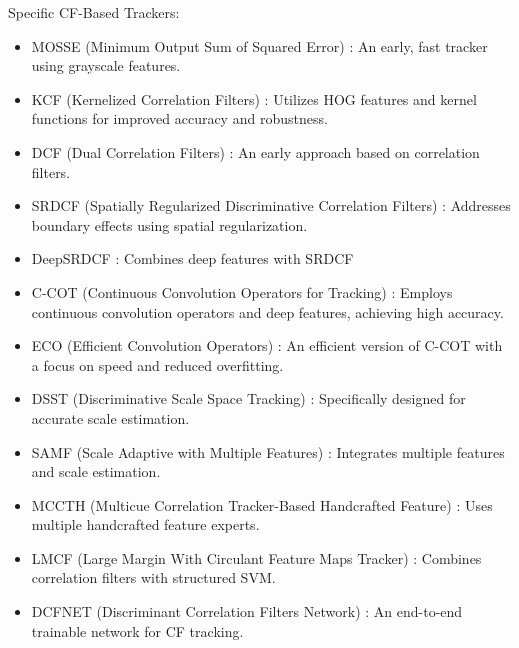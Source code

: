 Specific CF-Based Trackers:
\begin{itemize}
    \item MOSSE (Minimum Output Sum of Squared Error) \cite{lin2024motion}: An early, fast tracker using grayscale features.
    
    \item KCF (Kernelized Correlation Filters) \cite{zhao2020correlation}: Utilizes HOG features and kernel functions for improved accuracy and robustness.
    
    \item DCF (Dual Correlation Filters) \cite{feng2019dynamic}: An early approach based on correlation filters.
    
    \item SRDCF (Spatially Regularized Discriminative Correlation Filters) \cite{feng2019dynamic}: Addresses boundary effects using spatial regularization.
    
    \item DeepSRDCF \cite{zhao2020correlation}: Combines deep features with SRDCF
    
    \item C-COT (Continuous Convolution Operators for Tracking) \cite{du2021overview}: Employs continuous convolution operators and deep features, achieving high accuracy.
    
    \item ECO (Efficient Convolution Operators) \cite{feng2019dynamic}: An efficient version of C-COT with a focus on speed and reduced overfitting.
    
    \item DSST (Discriminative Scale Space Tracking) \cite{feng2019dynamic}: Specifically designed for accurate scale estimation.
    
    \item SAMF (Scale Adaptive with Multiple Features) \cite{lin2024motion}: Integrates multiple features and scale estimation.
    
    \item MCCTH (Multicue Correlation Tracker-Based Handcrafted Feature) \cite{du2021overview}: Uses multiple handcrafted feature experts.
    
    \item LMCF (Large Margin With Circulant Feature Maps Tracker) \cite{du2021overview}: Combines correlation filters with structured SVM.
    
    \item DCFNET (Discriminant Correlation Filters Network) \cite{du2021overview}: An end-to-end trainable network for CF tracking.
    

\end{itemize}
